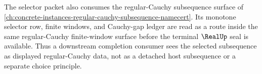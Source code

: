 The selector packet also consumes the regular-Cauchy subsequence surface of \autoref{ch:concrete-instances-regular-cauchy-subsequence-namecert}. Its monotone selector row, finite windows, and Cauchy-gap ledger are read as a route inside the same regular-Cauchy finite-window surface before the terminal $\RealUp$ seal is available. Thus a downstream completion consumer sees the selected subsequence as displayed regular-Cauchy data, not as a detached host subsequence or a separate choice principle.
